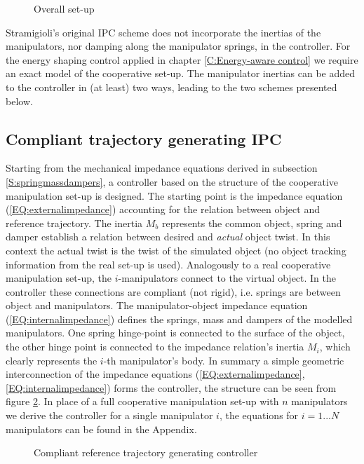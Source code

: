 \documentclass[a4paper,twoside, openright,12pt]{report}
\begin{document}
\begin{figure}[b]
	\centering
	\small
	\def\svgwidth{0.99\columnwidth}
	
	\caption{Overall set-up}
	\label{FIG:modelbasedcontrol}
\end{figure}
Stramigioli's original IPC scheme \cite{Stramigioli_01} does not incorporate the inertias of the manipulators, nor damping along the manipulator springs, in the controller. For the energy shaping control applied in chapter \ref{C:Energy-aware control} we require an exact model of the cooperative set-up. The manipulator inertias can be added to the controller in (at least) two ways, leading to the two schemes presented below.   

\subsection{Compliant trajectory generating IPC}\label{SS:referencetrajectoryDIPC}
Starting from the mechanical impedance equations derived in subsection \ref{S:springmassdampers}, a controller based on the structure of the cooperative manipulation set-up is designed. The starting point is the impedance equation (\ref{EQ:externalimpedance}) accounting for the relation between object and reference trajectory. The inertia $M_b$ represents the common object, spring and damper establish a relation between desired and \emph{actual} object twist. In this context the actual twist is the twist of the simulated object (no object tracking information from the real set-up is used). Analogously to a real cooperative manipulation set-up, the $i$-manipulators connect to the virtual object. In the controller these connections are compliant (not rigid), i.e. springs are between object and manipulators. The manipulator-object impedance equation (\ref{EQ:internalimpedance}) defines the springs, mass and dampers of the modelled manipulators. One spring hinge-point is connected to the surface of the object, the other hinge point is connected to the impedance relation's inertia  $M_i$, which clearly represents the $i$-th manipulator's body. In summary a simple geometric interconnection of the impedance equations (\ref{EQ:externalimpedance},\ref{EQ:internalimpedance}) forms the controller, the structure can be seen from figure \ref{FIG:referencetrajectory}. In place of a full cooperative manipulation set-up with $n$ manipulators we derive the controller for a single manipulator $i$, the equations for $i=1...N$ manipulators can be found in the Appendix.
\begin{figure}[b]
	\centering
	\small
	\def\svgwidth{0.8\columnwidth}
	
	\caption{Compliant reference trajectory generating controller}
	\label{FIG:referencetrajectory}
\end{figure}
\end{document}
